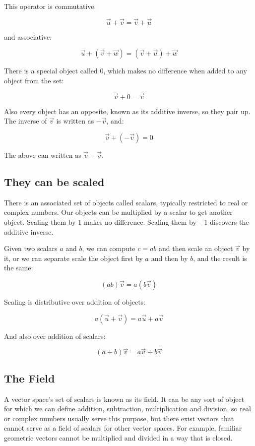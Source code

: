 This operator is commutative:

$$\vec{u} + \vec{v} = \vec{v} + \vec{u}$$

and associative:

$$\vec{u} + (\vec{v} + \vec{w}) = (\vec{v} + \vec{u}) + \vec{w}$$

There is a special object called $0$, which makes no difference when added to any object from the set:

$$\vec{v} + 0 = \vec{v}$$

Also every object has an opposite, known as its additive inverse, so they pair up. The inverse of $\vec{v}$ is written as $-\vec{v}$, and:

$$\vec{v} + (-\vec{v}) = 0$$

The above can written as $\vec{v} - \vec{v}$.

\subsection{They can be scaled}

There is an associated set of objects called scalars, typically restricted to real or complex numbers. Our objects can be multiplied by a scalar to get another object. Scaling them by $1$ makes no difference. Scaling them by $-1$ discovers the additive inverse.

Given two scalars $a$ and $b$, we can compute $c = ab$ and then scale an object $\vec{v}$ by it, or we can separate scale the object first by $a$ and then by $b$, and the result is the same:

$$(ab)\vec{v} = a(b\vec{v})$$

Scaling is distributive over addition of objects:

$$a(\vec{u} + \vec{v}) = a\vec{u} + a\vec{v}$$

And also over addition of scalars:

$$(a + b)\vec{v} = a\vec{v} + b\vec{v}$$

\subsection{The Field}

A vector space's set of scalars is known as its field. It can be any sort of object for which we can define addition, subtraction, multiplication and division, so real or complex numbers usually serve this purpose, but there exist vectors that cannot serve as a field of scalars for other vector spaces. For example, familiar geometric vectors cannot be multiplied and divided in a way that is closed.

